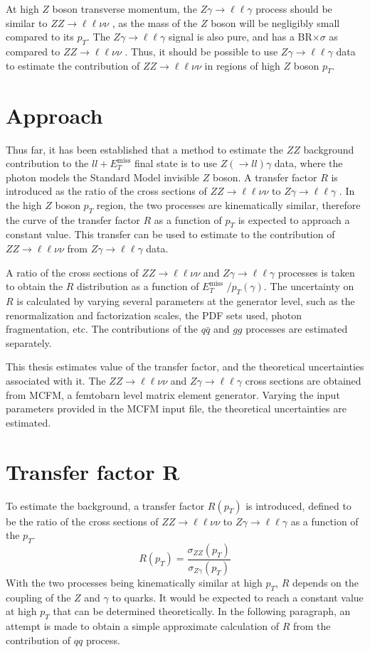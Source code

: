 \documentclass[12pt,a4paper,openright,twoside]{report}
\newcommand{\ZZ}{$ZZ\to \ell\ell\nu\nu$ }
\newcommand{\Zg}{$Z\gamma\to \ell\ell\gamma$ }
\newcommand{\met}{$E_T^{\mathrm{miss}}$ }
\begin{document}
At high $Z $ boson transverse momentum, the \Zg process should be similar to \ZZ, as the mass of the $Z$ boson will be negligibly small compared to its $p_T$. The \Zg signal is also pure, and has a BR$\times\sigma$ as compared to \ZZ. Thus, it should be possible to use \Zg data to estimate the contribution of \ZZ in regions of high $Z$ boson $p_T$.

\section{Approach}
Thus far, it has been established that a method to estimate the $ZZ$ background contribution to the $ll+$\met final state is to use $Z(\to ll)\gamma$ data, where the photon models the Standard Model invisible $Z$ boson. A transfer factor $R$ is introduced as the ratio of the cross sections of \ZZ to \Zg. In the high $Z$ boson $p_T$ region, the two processes are kinematically similar, therefore the curve of the transfer factor $R$ as a function of $p_T$ is expected to approach a constant value. This transfer can be used to estimate to the contribution of \ZZ from \Zg data.

A ratio of the cross sections of \ZZ and \Zg processes is taken to obtain the $R$ distribution as a function of \met/$p_T(\gamma)$. The uncertainty on $R$ is calculated by varying several parameters at the generator level, such as the renormalization and factorization scales, the PDF sets used, photon fragmentation, etc. The contributions of the $q \bar{q}$ and $gg$ processes are estimated separately.

This thesis estimates value of the transfer factor, and the theoretical uncertainties associated with it. The \ZZ and \Zg cross sections are obtained from MCFM, a femtobarn level matrix element generator. Varying the input parameters provided in the MCFM input file, the theoretical uncertainties are estimated.

\section{Transfer factor R}\label{sec:R}
To estimate the background, a transfer factor $R(p_T)$ is introduced, defined to be the ratio of the cross sections of \ZZ to \Zg as a function of the $p_T$.
\begin{equation}
	R(p_{T}) = \frac{\sigma_{ZZ}(p_{T})}{\sigma_{Z\gamma}(p_T)}
\end{equation}
With the two processes being kinematically similar at high $p_T$, $R$ depends on the coupling of the $Z$ and $\gamma$ to quarks. It would be expected to reach a constant value at high $p_T$ that can be determined theoretically. In the following paragraph, an attempt is made to obtain a simple approximate calculation of $R$ from the contribution of $qq$ process.
\end{document}
